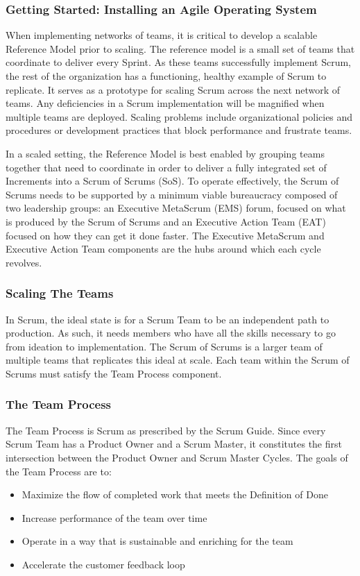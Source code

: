 \documentclass[12pt,a4paper,parskip=full]{scrartcl}
\begin{document}
\subsubsection{Getting Started: Installing an Agile Operating
System}\label{getting-started-installing-an-agile-operating-system}

When implementing networks of teams, it is critical to develop a scalable Reference Model prior to scaling. The reference model is a small set of teams that coordinate to deliver every Sprint. As these teams successfully implement Scrum, the rest of the organization has a functioning, healthy example of Scrum to replicate. It serves as a prototype for scaling Scrum across the next network of teams. Any deficiencies in a Scrum implementation will be magnified when multiple teams are deployed. Scaling problems include organizational policies and procedures or development practices that block performance and frustrate teams.

In a scaled setting, the Reference Model is best enabled by grouping teams together that need to coordinate in order to deliver a fully integrated set of Increments into a Scrum of Scrums (SoS). To operate effectively, the Scrum of Scrums needs to be supported by a minimum viable bureaucracy composed of two leadership groups: an Executive MetaScrum (EMS) forum, focused on what is produced by the Scrum of Scrums and an Executive Action Team (EAT) focused on how they can get it done faster. The Executive MetaScrum and Executive Action Team components are the hubs around which each cycle revolves.

\subsubsection{Scaling The Teams}\label{scaling-the-teams}

In Scrum, the ideal state is for a Scrum Team to be an independent path to production. As such, it needs members who have all the skills necessary to go from ideation to implementation. The Scrum of Scrums is a larger team of multiple teams that replicates this ideal at scale. Each team within the Scrum of Scrums must satisfy the Team Process component.

\subsubsection{The Team Process}\label{the-team-process}

The Team Process is Scrum as prescribed by the Scrum Guide. Since every Scrum Team has a Product Owner and a Scrum Master, it constitutes the first intersection between the Product Owner and Scrum Master Cycles. The goals of the Team Process are to:
\begin{itemize}
\itemsep1pt\parskip0pt
\item
 Maximize the flow of completed work that meets the Definition of Done
\item
  Increase performance of the team over time
\item
  Operate in a way that is sustainable and enriching for the team
\item
  Accelerate the customer feedback loop
\end{itemize}
\end{document}
